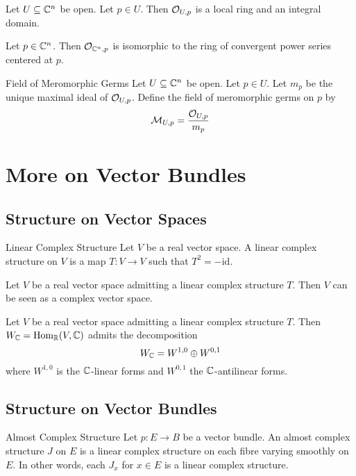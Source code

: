\documentclass[a4paper]{article}
\begin{document}
\begin{prp}{}{} Let $U\subseteq\mathbb{C}^n$ be open. Let $p\in U$. Then $\mathcal{O}_{U,p}$ is a local ring and an integral domain. 
\end{prp}

\begin{prp}{}{} Let $p\in\mathbb{C}^n$. Then $\mathcal{O}_{\mathbb{C}^n,p}$ is isomorphic to the ring of convergent power series centered at $p$. 
\end{prp}

\begin{defn}{Field of Meromorphic Germs}{} Let $U\subseteq\mathbb{C}^n$ be open. Let $p\in U$. Let $m_p$ be the unique maximal ideal of $\mathcal{O}_{U,p}$. Define the field of meromorphic germs on $p$ by $$\mathcal{M}_{U,p}=\frac{\mathcal{O}_{U,p}}{m_p}$$
\end{defn}

\pagebreak
\section{More on Vector Bundles}
\subsection{Structure on Vector Spaces}
\begin{defn}{Linear Complex Structure}{} Let $V$ be a real vector space. A linear complex structure on $V$ is a map $T:V\to V$ such that $T^2=-\text{id}$. 
\end{defn}

\begin{prp}{}{} Let $V$ be a real vector space admitting a linear complex structure $T$. Then $V$ can be seen as a complex vector space. 
\end{prp}

\begin{prp}{}{} Let $V$ be a real vector space admitting a linear complex structure $T$. Then $W_{\mathbb{C}}=\operatorname{Hom}_{\mathbb{R}}(V,\mathbb{C})$ admits the decomposition $$W_{\mathbb{C}}=W^{1,0}\oplus W^{0,1}$$ where $W^{1,0}$ is the $\mathbb{C}$-linear forms and $W^{0,1}$ the $\mathbb{C}$-antilinear forms. 
\end{prp}

\subsection{Structure on Vector Bundles}
\begin{defn}{Almost Complex Structure}{} Let $p:E\to B$ be a vector bundle. An almost complex structure $J$ on $E$ is a linear complex structure on each fibre varying smoothly on $E$. In other words, each $J_x$ for $x\in E$ is a linear complex structure. 
\end{defn}
\end{document}
